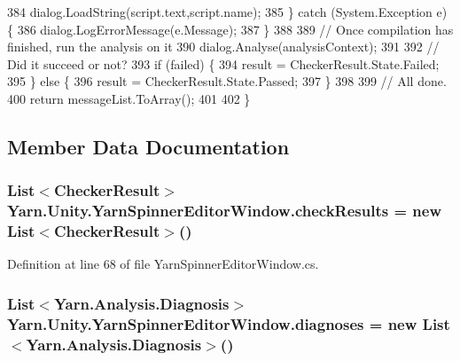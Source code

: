 \begin{DoxyCode}
384                 dialog.LoadString(script.text,script.name);
385             \} \textcolor{keywordflow}{catch} (System.Exception e) \{
386                 dialog.LogErrorMessage(e.Message);
387             \}
388 
389             \textcolor{comment}{// Once compilation has finished, run the analysis on it}
390             dialog.Analyse(analysisContext);
391 
392             \textcolor{comment}{// Did it succeed or not?}
393             \textcolor{keywordflow}{if} (failed) \{
394                 result = CheckerResult.State.Failed;
395             \} \textcolor{keywordflow}{else} \{
396                 result = CheckerResult.State.Passed;
397             \}
398 
399             \textcolor{comment}{// All done.}
400             \textcolor{keywordflow}{return} messageList.ToArray();
401 
402         \}
\end{DoxyCode}


\subsection{Member Data Documentation}
\hypertarget{a00166_aa85ab7bd194e5425b991b9c216d4d10e}{
\subsubsection[{check\-Results}]{\setlength{\rightskip}{0pt plus 5cm}List$<${\bf Checker\-Result}$>$ Yarn.\-Unity.\-Yarn\-Spinner\-Editor\-Window.\-check\-Results = new List$<${\bf Checker\-Result}$>$()\hspace{0.3cm}{\ttfamily [private]}}}\label{a00166_aa85ab7bd194e5425b991b9c216d4d10e}


Definition at line 68 of file Yarn\-Spinner\-Editor\-Window.\-cs.

\hypertarget{a00166_a25c92cbfdd09661a96714d05b14af886}{
\subsubsection[{diagnoses}]{\setlength{\rightskip}{0pt plus 5cm}List$<${\bf Yarn.\-Analysis.\-Diagnosis}$>$ Yarn.\-Unity.\-Yarn\-Spinner\-Editor\-Window.\-diagnoses = new List$<${\bf Yarn.\-Analysis.\-Diagnosis}$>$()\hspace{0.3cm}{\ttfamily [private]}}}\label{a00166_a25c92cbfdd09661a96714d05b14af886}


